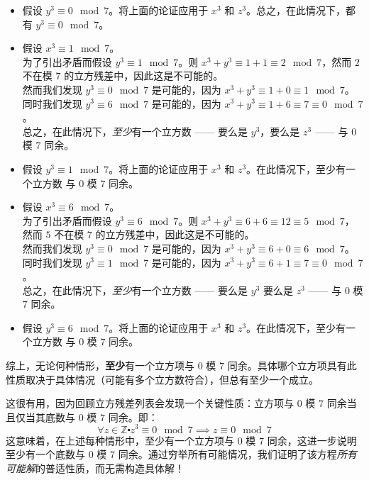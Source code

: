 \begin{example}
\begin{itemize}
        \item 假设 $y^3 \equiv 0 \mod 7$。将上面的论证应用于 $x^3$ 和 $z^3$。总之，在此情况下，都有 $y^3 \equiv 0 \mod 7$。
        
        \item 假设 $x^3 \equiv 1 \mod 7$。\\
            为了引出矛盾而假设 $y^3 \equiv 1 \mod 7$。则 $x^3+y^3 \equiv 1+1 \equiv 2 \mod 7$，然而 $2$ 不在模 $7$ 的立方残差中，因此这是不可能的。\\
            然而我们发现 $y^3 \equiv 0 \mod 7$ 是可能的，因为 $x^3+y^3 \equiv 1+0 \equiv 1 \mod 7$。\\
            同时我们发现 $y^3 \equiv 6 \mod 7$ 是可能的，因为 $x^3+y^3 \equiv 1+6 \equiv 7 \equiv 0 \mod 7$。\\
            总之，在此情况下，\emph{至少}有一个立方数 —— 要么是 $y^3$，要么是 $z^3$ —— 与 $0$ 模 $7$ 同余。

        \item 假设 $y^3 \equiv 1 \mod 7$。将上面的论证应用于 $x^3$ 和 $z^3$。在此情况下，至少有一个立方数 与 $0$ 模 $7$ 同余。
        
        \item 假设 $x^3 \equiv 6 \mod 7$。\\
            为了引出矛盾而假设 $y^3 \equiv 6 \mod 7$。则 $x^3+y^3 \equiv 6+6 \equiv 12 \equiv 5 \mod 7$，然而 $5$ 不在模 $7$ 的立方残差中，因此这是不可能的。\\
            然而我们发现 $y^3 \equiv 0 \mod 7$ 是可能的，因为 $x^3+y^3 \equiv 6+0 \equiv 6 \mod 7$。\\
            同时我们发现 $y^3 \equiv 1 \mod 7$ 是可能的，因为 $x^3+y^3 \equiv 6+1 \equiv 7 \equiv 0 \mod 7$。\\
            总之，在此情况下，\emph{至少}有一个立方数 —— 要么是 $y^3$ 要么是 $z^3$ —— 与 $0$ 模 $7$ 同余。

        \item 假设 $y^3 \equiv 6 \mod 7$。将上面的论证应用于 $x^3$ 和 $z^3$。在此情况下，至少有一个立方数 与 $0$ 模 $7$ 同余。
    \end{itemize}

    综上，无论何种情形，\textbf{至少}有一个立方项与 $0$ 模 $7$ 同余。具体哪个立方项具有此性质取决于具体情况（可能有多个立方数符合），但总有至少一个成立。

    这很有用，因为回顾立方残差列表会发现一个关键性质：立方项与 $0$ 模 $7$ 同余当且仅当其底数与 $0$ 模 $7$ 同余。即：
    \[\forall z \in \mathbb{Z} \centerdot z^3 \equiv 0 \mod 7 \implies z \equiv 0 \mod 7\]
    这意味着，在上述每种情形中，至少有一个立方项与 $0$ 模 $7$ 同余，这进一步说明至少有一个底数与 $0$ 模 $7$ 同余。通过穷举所有可能情况，我们证明了该方程\emph{所有可能解}的普适性质，而无需构造具体解！
\end{example}

